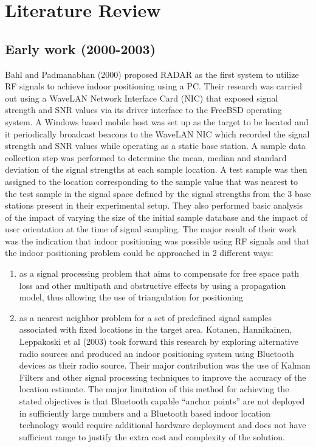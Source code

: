 \chapter{Literature Review}

\section{Early work (2000-2003)}

Bahl and Padmanabhan (2000) proposed RADAR as the first system to utilize RF signals to achieve indoor positioning using a PC. Their research was carried out using a WaveLAN Network Interface Card (NIC) that exposed signal strength and SNR values via its driver interface to the FreeBSD operating system. A Windows based mobile host was set up as the target to be located and it periodically broadcast beacons to the WaveLAN NIC which recorded the signal strength and SNR values while operating as a static base station. A sample data collection step was performed to determine the mean, median and standard deviation of the signal strengths at each sample location. A test sample was then assigned to the location corresponding to the sample value that was nearest to the test sample in the signal space defined by the signal strengths from the 3 base stations present in their experimental setup. They also performed basic analysis of the impact of varying the size of the initial sample database and the impact of user orientation at the time of signal sampling. The major result of their work was the indication that indoor positioning was possible using RF signals and that the indoor positioning problem could be approached in 2 different ways:

\begin{enumerate}
\item as a signal processing problem that aims to compensate for free space path loss and other multipath and obstructive effects by using a propagation model, thus allowing the use of triangulation for positioning 
\item as a nearest neighbor problem for a set of predefined signal samples associated with fixed locations in the target area.
Kotanen, Hannikainen, Leppakoski et al (2003) took forward this research by exploring alternative radio sources and produced an indoor positioning system using Bluetooth devices as their radio source. Their major contribution was the use of Kalman Filters and other signal processing techniques to improve the accuracy of the location estimate. The major limitation of this method for achieving the stated objectives is that Bluetooth capable “anchor points” are not deployed in sufficiently large numbers and a Bluetooth based indoor location technology would require additional hardware deployment and does not have sufficient range to justify the extra cost and complexity of the solution.
\end{enumerate}


